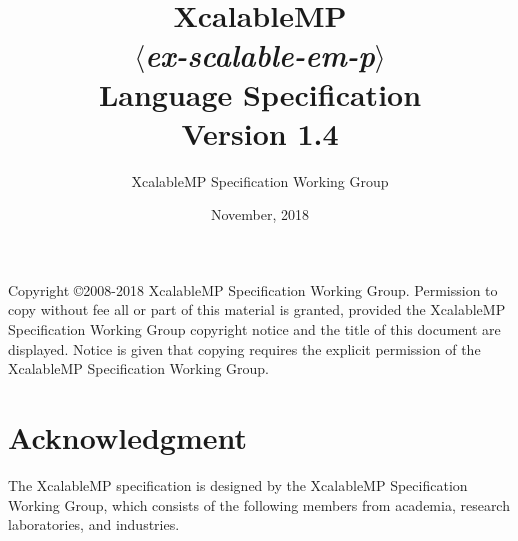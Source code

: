 \documentclass[a4paper,11pt,twoside]{report}
\title{{\Huge XcalableMP}\\
$\langle${\it ex-scalable-em-p}$\rangle$\\
Language Specification\\
\vspace{2cm}
Version 1.4\\}
\author{
\Large XcalableMP Specification Working Group\\
}
\date{\vspace{4cm}\Large November, 2018}
\def\XMP{XcalableMP}
\begin{document}
\maketitle

Copyright \copyright 2008-2018 {\XMP} Specification Working Group.
Permission to copy without fee all or part of this material is granted,
provided the {\XMP} Specification Working Group copyright notice and the
title of this document are displayed. Notice is given that copying
requires the explicit permission of the {\XMP} Specification Working
Group.

\clearpage

\cleardoublepage

\tableofcontents
\listoffigures
\listoftables

\chapter*{Acknowledgment}

The {\XMP} specification is designed by the {\XMP} Specification
Working Group, which consists of the following members from academia,
research laboratories, and industries.
\end{document}
